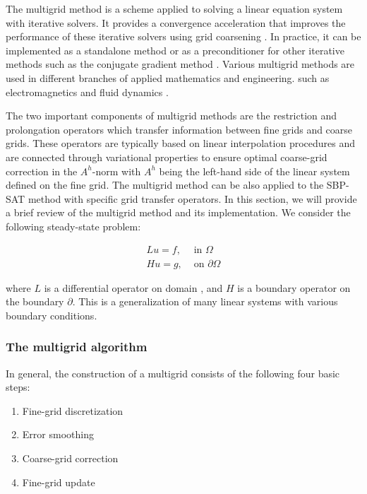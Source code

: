
The multigrid method is a scheme applied to solving a linear equation system with iterative solvers. It provides a convergence acceleration that improves the performance of these iterative solvers using grid coarsening \cite{fedorenko1973iterative} \cite{trottenberg2000multigrid}. In practice, it can be implemented as a standalone method or as a preconditioner for other iterative methods such as the conjugate gradient method \cite{tatebe1993multigrid}. Various multigrid methods are used in different branches of applied mathematics and engineering. such as electromagnetics \cite{stolk2014multigrid} and fluid dynamics \cite{adler2016monolithic}.  

The two important components of multigrid methods are the restriction and prolongation operators which transfer information between fine grids and coarse grids. These operators are typically based on linear interpolation procedures and are connected through variational properties \cite{10.5555/357695} to ensure optimal coarse-grid correction in the $A^h$-norm with $A^h$ being the left-hand side of the linear system defined on the fine grid. The multigrid method can be also applied to the SBP-SAT method with specific grid transfer operators. In this section, we will provide a brief review of the multigrid method and its implementation. We consider the following steady-state problem:

\begin{align}
    Lu = f, &\text{ in }  \text{$\Omega$}  \label{stead-state-problem}\\
    Hu = g, &\text{ on } \partial\text{$\Omega$}
    \label{stead-state-problem2}
\end{align}

where $L$ is a differential operator on domain \text{$\Omega$},  and $H$ is a boundary operator on the boundary $\partial$\text{$\Omega$}. This is a generalization of many linear systems with various boundary conditions. 

\subsubsection{The multigrid algorithm}
In general, the construction of a multigrid consists of the following four basic steps:

\begin{enumerate}
    \item Fine-grid discretization
    \item Error smoothing
    \item Coarse-grid correction
    \item Fine-grid update
\end{enumerate}

